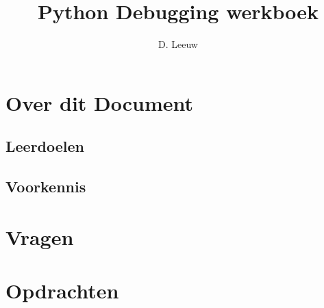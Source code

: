 \documentclass[a4paper,12pt,twoside,openright,titlepage]{article}
\author{D. Leeuw}
\title{Python Debugging werkboek}
\date{\today\\
\vfill
\raggedright
\copyright\ 2025 Dennis Leeuw\\
}
\begin{document}

\maketitle


\section{Over dit Document}
\subsection{Leerdoelen}

\subsection{Voorkennis}




\section{Vragen}

\section{Opdrachten}


\printindex
\end{document}

